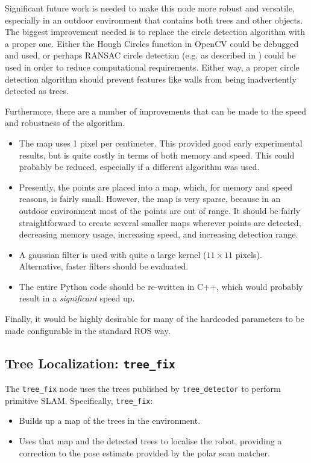 \documentclass[12pt,oneside,a4paper]{book}
\begin{document}
Significant future work is needed to make this node more robust and
versatile, especially in an outdoor environment that contains both
trees and other objects. The biggest improvement needed is to replace
the circle detection algorithm with a proper one. Either the Hough
Circles function in OpenCV could be debugged and used, or perhaps
RANSAC circle detection (e.g. as described in \cite{ransac}) could be
used in order to reduce computational requirements. Either way, a
proper circle detection algorithm should prevent features like walls
from being inadvertently detected as trees.

Furthermore, there are a number of improvements that can be made to
the speed and robustness of the algorithm.
\begin{itemize}
\item The map uses 1 pixel per centimeter. This provided good early
  experimental results, but is quite costly in terms of both memory
  and speed. This could probably be reduced, especially if a different
  algorithm was used.
\item Presently, the points are placed into a map, which, for memory
  and speed reasons, is fairly small. However, the map is very sparse,
  because in an outdoor environment most of the points are out of range.
  It should be fairly straightforward to create several smaller maps
  wherever points are detected, decreasing memory usage, increasing
  speed, and increasing detection range.
\item A gaussian filter is used with quite a large kernel ($11 \times
  11$ pixels). Alternative, faster filters should be evaluated.
\item The entire Python code should be re-written in C++, which would
  probably result in a \emph{significant} speed up.
\end{itemize}

Finally, it would be highly desirable for many of the hardcoded
parameters to be made configurable in the standard ROS way.
\newpage
\subsection{Tree Localization: \texttt{tree\_fix}}
\label{sec:tree_fix}

The \texttt{tree\_fix} node uses the trees published by
\texttt{tree\_detector} to perform primitive SLAM. Specifically, \texttt{tree\_fix}:
\begin{itemize}
\item Builds up a map of the trees in the environment.
\item Uses that map and the detected trees to localise the robot,
  providing a correction to the pose estimate provided by the polar
  scan matcher.
\end{itemize}
\end{document}
